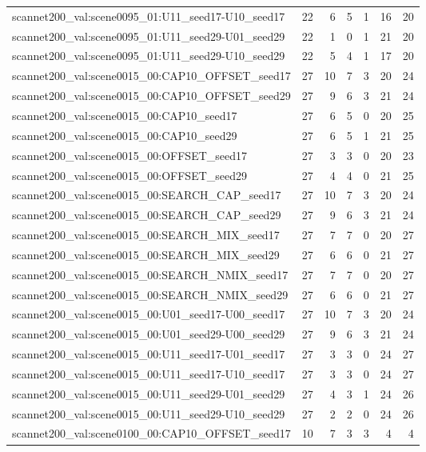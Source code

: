 \begin{table}[t]
\begin{tabular}{lrrrrrr}
scannet200\_val:scene0095\_01:U11\_seed17-U10\_seed17 & 22 & 6 & 5 & 1 & 16 & 20 \\
scannet200\_val:scene0095\_01:U11\_seed29-U01\_seed29 & 22 & 1 & 0 & 1 & 21 & 20 \\
scannet200\_val:scene0095\_01:U11\_seed29-U10\_seed29 & 22 & 5 & 4 & 1 & 17 & 20 \\
scannet200\_val:scene0015\_00:CAP10\_OFFSET\_seed17 & 27 & 10 & 7 & 3 & 20 & 24 \\
scannet200\_val:scene0015\_00:CAP10\_OFFSET\_seed29 & 27 & 9 & 6 & 3 & 21 & 24 \\
scannet200\_val:scene0015\_00:CAP10\_seed17 & 27 & 6 & 5 & 0 & 20 & 25 \\
scannet200\_val:scene0015\_00:CAP10\_seed29 & 27 & 6 & 5 & 1 & 21 & 25 \\
scannet200\_val:scene0015\_00:OFFSET\_seed17 & 27 & 3 & 3 & 0 & 20 & 23 \\
scannet200\_val:scene0015\_00:OFFSET\_seed29 & 27 & 4 & 4 & 0 & 21 & 25 \\
scannet200\_val:scene0015\_00:SEARCH\_CAP\_seed17 & 27 & 10 & 7 & 3 & 20 & 24 \\
scannet200\_val:scene0015\_00:SEARCH\_CAP\_seed29 & 27 & 9 & 6 & 3 & 21 & 24 \\
scannet200\_val:scene0015\_00:SEARCH\_MIX\_seed17 & 27 & 7 & 7 & 0 & 20 & 27 \\
scannet200\_val:scene0015\_00:SEARCH\_MIX\_seed29 & 27 & 6 & 6 & 0 & 21 & 27 \\
scannet200\_val:scene0015\_00:SEARCH\_NMIX\_seed17 & 27 & 7 & 7 & 0 & 20 & 27 \\
scannet200\_val:scene0015\_00:SEARCH\_NMIX\_seed29 & 27 & 6 & 6 & 0 & 21 & 27 \\
scannet200\_val:scene0015\_00:U01\_seed17-U00\_seed17 & 27 & 10 & 7 & 3 & 20 & 24 \\
scannet200\_val:scene0015\_00:U01\_seed29-U00\_seed29 & 27 & 9 & 6 & 3 & 21 & 24 \\
scannet200\_val:scene0015\_00:U11\_seed17-U01\_seed17 & 27 & 3 & 3 & 0 & 24 & 27 \\
scannet200\_val:scene0015\_00:U11\_seed17-U10\_seed17 & 27 & 3 & 3 & 0 & 24 & 27 \\
scannet200\_val:scene0015\_00:U11\_seed29-U01\_seed29 & 27 & 4 & 3 & 1 & 24 & 26 \\
scannet200\_val:scene0015\_00:U11\_seed29-U10\_seed29 & 27 & 2 & 2 & 0 & 24 & 26 \\
scannet200\_val:scene0100\_00:CAP10\_OFFSET\_seed17 & 10 & 7 & 3 & 3 & 4 & 4 \\

\end{tabular}
\end{table}
